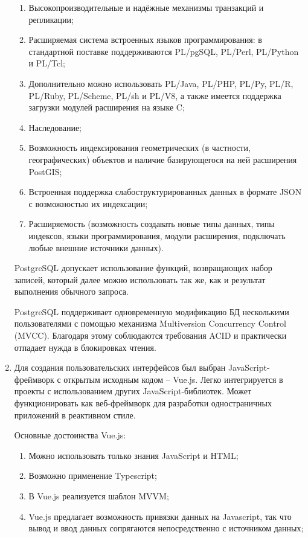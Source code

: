 \documentclass{altsu-report}
\begin{document}
\begin{enumerate}
    \begin{enumerate}
        \item Высокопроизводительные и надёжные механизмы транзакций и репликации;
        \item Расширяемая система встроенных языков программирования: в стандартной поставке поддерживаются PL/pgSQL, PL/Perl, PL/Python и PL/Tcl;
        \item Дополнительно можно использовать PL/Java, PL/PHP, PL/Py, PL/R, PL/Ruby, PL/Scheme, PL/sh и PL/V8, а также имеется поддержка загрузки модулей расширения на языке C;
        \item Наследование;
        \item Возможность индексирования геометрических (в частности, географических) объектов и наличие базирующегося на ней расширения PostGIS;
        \item Встроенная поддержка слабоструктурированных данных в формате JSON с возможностью их индексации;
        \item Расширяемость (возможность создавать новые типы данных, типы индексов, языки программирования, модули расширения, подключать любые внешние источники данных).
    \end{enumerate}
    
    PostgreSQL допускает использование функций, возвращающих набор записей, который далее можно использовать так же, как и результат выполнения обычного запроса.
    
    PostgreSQL поддерживает одновременную модификацию БД несколькими пользователями с помощью механизма Multiversion Concurrency Control (MVCC). Благодаря этому соблюдаются требования ACID и практически отпадает нужда в блокировках чтения.

    \item Для создания пользовательских интерфейсов был выбран JavaScript-фреймворк с открытым исходным кодом -- Vue.js. Легко интегрируется в проекты с использованием других JavaScript-библиотек. Может функционировать как веб-фреймворк для разработки одностраничных приложений в реактивном стиле.

    Основные достоинства Vue.js:

    \begin{enumerate}
        \item Можно использовать только знания JavaScript и HTML;
        \item Возможно применение Typescript;
        \item В Vue.js реализуется шаблон MVVM;
        \item Vue.js предлагает возможность привязки данных на Javascript, так что вывод и ввод данных сопрягаются непосредственно с источником данных;
    \end{enumerate}
    

\end{enumerate}
\end{document}
